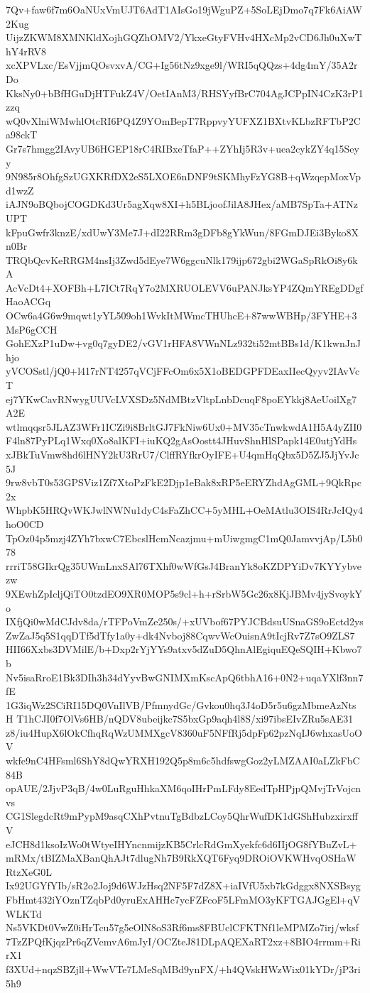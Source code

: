 7Qv+faw6f7m6OaNUxVmUJT6AdT1AIsGo19jWguPZ+5SoLEjDmo7q7Fk6AiAW2Kug
UijzZKWM8XMNKldXojhGQZhOMV2/YkxeGtyFVHv4HXcMp2vCD6Jh0uXwThY4rRV8
xcXPVLxc/EsVjjmQOsvxvA/CG+Ig56tNz9xge9l/WRI5qQQzs+4dg4mY/35A2rDo
KksNy0+bBfHGuDjHTFukZ4V/OetIAnM3/RHSYyfBrC704AgJCPpIN4CzK3rP1zzq
wQ0vXlniWMwhlOtcRI6PQ4Z9YOmBepT7RppvyYUFXZ1BXtvKLbzRFTbP2Ca98ckT
Gr7s7hmgg2IAvyUB6HGEP18rC4RIBxeTfaP++ZYhIj5R3v+uea2cykZY4q15Seyy
9N985r8OhfgSzUGXKRfDX2eS5LXOE6nDNF9tSKMhyFzYG8B+qWzqepMoxVpd1wzZ
iAJN9oBQbojCOGDKd3Ur5agXqw8XI+h5BLjoofJilA8JHex/aMB7SpTa+ATNzUPT
kFpuGwfr3knzE/xdUwY3Me7J+dI22RRm3gDFb8gYkWun/8FGmDJEi3Byko8Xn0Br
TRQbQcvKeRRGM4nsIj3Zwd5dEye7W6ggcuNlk179ijp672gbi2WGaSpRkOi8y6kA
AcVcDt4+XOFBh+L7ICt7RqY7o2MXRUOLEVV6uPANJksYP4ZQmYREgDDgfHaoACGq
OCw6a4G6w9mqwt1yYL509oh1WvkItMWmcTHUhcE+87wwWBHp/3FYHE+3MsP6gCCH
GohEXzP1uDw+vg0q7gyDE2/vGV1rHFA8VWnNLz932ti52mtBBs1d/K1kwnJnJhjo
yVCOSstl/jQ0+l417rNT4257qVCjFFcOm6x5X1oBEDGPFDEaxIIecQyyv2IAvVcT
ej7YKwCavRNwygUUVcLVXSDz5NdMBtzVltpLnbDcuqF8poEYkkj8AeUoilXg7A2E
wtlmqqsr5JLAZ3WFr1ICZi9i8BrltGJ7FkNiw6Ux0+MV35cTnwkwdA1H5A4yZII0
F4ln87PyPLq1Wxq0Xo8alKFI+iuKQ2gAsOostt4JHuvShnHlSPapk14E0utjYdHs
xJBkTuVmw8hd6lHNY2kU3RrU7/ClffRYfkrOyIFE+U4qmHqQbx5D5ZJ5JjYvJc5J
9rw8vbT0s53GPSViz1Zf7XtoPzFkE2Djp1eBak8xRP5eERYZhdAgGML+9QkRpc2x
WhpbK5HRQvWKJwlNWNu1dyC4sFaZhCC+5yMHL+OeMAtlu3OIS4RrJcIQy4hoO0CD
TpOz04p5mzj4ZYh7bxwC7EbcslHcmNcazjmu+mUiwgmgC1mQ0JamvvjAp/L5b078
rrriT58GIkrQg35UWmLnxSAl76TXhf0wWfGsJ4BranYk8oKZDPYiDv7KYYybvezw
9XEwhZpIcljQiTO0tzdEO9XR0MOP5s9cl+h+rSrbW5Gc26x8KjJBMv4jySvoykYo
IXfjQi0wMdCJdv8da/rTFPoVmZe250s/+xUVbof67PYJCBdsuUSnaGS9oEctd2ys
ZwZaJ5q5S1qqDTf5dTfy1a0y+dk4Nvboj88CqwvWcOuisnA9tIcjRv7Z7sO9ZLS7
HII66Xxbs3DVMilE/b+Dxp2rYjYYs9atxv5dZuD5QhnAlEgiquEQeSQIH+Kbwo7b
Nv5isaRroE1Bk3DIh3h34dYyvBwGNIMXmKscApQ6tbhA16+0N2+uqaYXlf3nn7fE
1G3iqWz2SCiRI15DQ0VnIlVB/PfmnydGc/Gvkou0hq3J4oD5r5u6gzMbmeAzNtsH
T1hCJI0f7OlVs6HB/nQDV8ubeijkc7S5bxGp9aqh4l8S/xi97ibsEIvZRu5sAE31
z8/iu4HupX6lOkCfhqRqWzUMMXgcV8360uF5NFfRj5dpFp62pzNqIJ6whxasUoOV
wkfe9nC4HFsml6ShY8dQwYRXH192Q5p8m6c5hdfswgGoz2yLMZAAI0aLZkFbC84B
opAUE/2JjvP3qB/4w0LuRguHhkaXM6qoIHrPmLFdy8EedTpHPjpQMvjTrVojcnvs
CG1SlegdcRt9mPypM9asqCXhPvtnuTgBdbzLCoy5QhrWufDK1dGShHubzxirxffV
eJCH8d1ksoIzWo0tWtyeIHYncnmijzKB5CrlcRdGmXyekfc6d6IIjOG8fYBuZvL+
mRMx/tBIZMaXBanQhAJt7dlugNh7B9RkXQT6Fyq9DROiOVKWHvqOSHaWRtzXeG0L
Ix92UGYfYIb/sR2o2Joj9d6WJzHsq2NF5F7dZ8X+iaIVfU5xb7kGdggx8NXSBsyg
FbHmt432iYOznTZqbPd0yruExAHHc7ycFZFcoF5LFmMO3yKFTGAJGgEl+qVWLKTd
Ns5VKDt0VwZ0iHrTcu57g5eOlN8oS3Rf6ms8FBUclCFKTNf1leMPMZo7irj/wksf
7TzZPQfKjqzPr6qZVemvA6mJyI/OCZteJ81DLpAQEXaRT2xz+8BIO4rrmm+RirX1
f3XUd+nqzSBZjll+WwVTe7LMeSqMBd9ynFX/+h4QVskHWzWix01kYDr/jP3ri5h9
